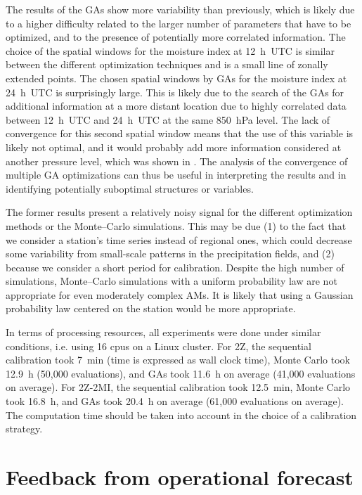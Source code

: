\documentclass[gmdd]{copernicus}
\begin{document}
The results of the GAs show more variability than previously, which is likely due to a higher difficulty related to the larger number of parameters that have to be optimized, and to the presence of potentially more correlated information. The choice of the spatial windows for the moisture index at 12~h~UTC is similar between the different optimization techniques and is a small line of zonally extended points. The chosen spatial windows by GAs for the moisture index at 24~h~UTC is surprisingly large. This is likely due to the search of the GAs for additional information at a more distant location due to highly correlated data between 12~h~UTC and 24~h~UTC at the same 850~hPa level. The lack of convergence for this second spatial window means that the use of this variable is likely not optimal, and it would probably add more information considered at another pressure level, which was shown in \citet{Horton2018a}. The analysis of the convergence of multiple GA optimizations can thus be useful in interpreting the results and in identifying potentially suboptimal structures or variables.

The former results present a relatively noisy signal for the different optimization methods or the Monte--Carlo simulations. This may be due (1) to the fact that we consider a station’s time series instead of regional ones, which could decrease some variability from small-scale patterns in the precipitation fields, and (2) because we consider a short period for calibration. Despite the high number of simulations, Monte--Carlo simulations with a uniform probability law are not appropriate for even moderately complex AMs. It is likely that using a Gaussian probability law centered on the station would be more appropriate.

In terms of processing resources, all experiments were done under similar conditions, i.e. using 16 cpus on a Linux cluster. For 2Z, the sequential calibration took 7~min (time is expressed as wall clock time), Monte Carlo took 12.9~h (50,000 evaluations), and GAs took 11.6~h on average (41,000 evaluations on average). For 2Z-2MI, the sequential calibration took 12.5~min, Monte Carlo took 16.8~h, and GAs took 20.4~h on average (61,000 evaluations on average). The computation time should be taken into account in the choice of a calibration strategy.


\section{Feedback from operational forecast}
\label{sec:operational}
\end{document}
